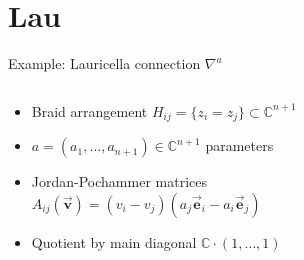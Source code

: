 \documentclass{beamer}
\newcommand{\C}{\mathbb{C}}
\begin{document}
\section{Lau}
\begin{frame}{Example: Lauricella connection \(\nabla^a\)}
	\begin{columns}
		\begin{column}{.7\textwidth}
			\begin{itemize}
				\item Braid arrangement \(H_{ij}=\{z_i=z_j\} \subset \C^{n+1}\) 
				\item \(a=(a_1, \ldots, a_{n+1}) \in \C^{n+1}\) parameters 
				\item Jordan-Pochammer matrices 
				\(A_{ij}(\vec{\mathbf{v}}) = (v_i-v_j)(a_j \vec{\mathbf{e}}_i- a_i \vec{\mathbf{e}}_j)\)
				\item Quotient by main diagonal \(\C \cdot (1, \ldots, 1)\)
			\end{itemize}
		\end{column}
	
		\begin{column}{.4\textwidth}
				\begin{figure}
			\end{figure}
		\end{column}
	\end{columns}
	

\end{frame}
\end{document}
